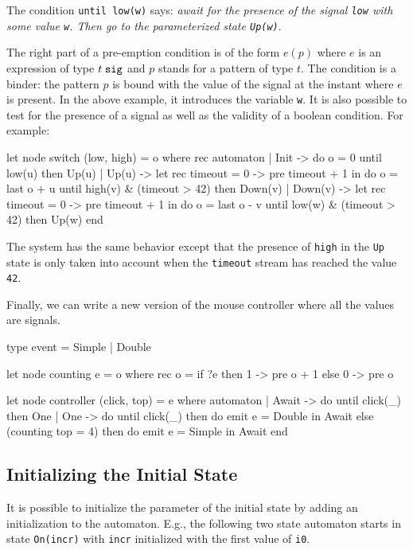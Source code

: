 \documentclass[11pt,titlepage,twoside]{report}
\begin{document}
The condition \verb-until low(w)- says: {\em await for the presence of
  the signal \verb-low- with some value \verb-w-. Then go to the
  parameterized state \verb-Up(w)-}.

\newcommand{\Signal}[1]{{#1}\;\mbox{\tt sig}}

The right part of a pre-emption condition is of the form $e(p)$ where
$e$ is an expression of type $\Signal{t}$ and $p$ stands for a pattern
of type $t$. The condition is a binder: the pattern $p$ is bound with
the value of the signal at the instant where $e$ is present.  In the
above example, it introduces the variable \verb-w-. It is also
possible to test for the presence of a signal as well as the validity
of a boolean condition. For example:

\begin{runverbatim}[withresult]
let node switch (low, high) = o where
  rec automaton
  | Init -> do o = 0 until low(u) then Up(u)
  | Up(u) ->
      let rec timeout = 0 -> pre timeout + 1 in
      do o = last o + u
      until high(v) & (timeout > 42) then Down(v)
  | Down(v) ->
      let rec timeout = 0 -> pre timeout + 1 in
      do o = last o - v
      until low(w) & (timeout > 42) then Up(w)
  end
\end{runverbatim}
The system has the same behavior except that the presence of
\verb-high- in the \verb-Up- state is only taken into account when the
\verb-timeout- stream has reached the value \verb-42-.

Finally, we can write a new version of the mouse controller where all
the values are signals.

\begin{runverbatim}[withresult]
type event = Simple | Double

let node counting e = o where
  rec o = if ?e then 1 -> pre o + 1 else 0 -> pre o

let node controller (click, top) = e where
  automaton
  | Await ->
     do until click(_) then One
  | One ->
     do until click(_) then do emit e = Double in Await
     else (counting top = 4) then do emit e = Simple in Await
  end
\end{runverbatim}

\subsection{Initializing the Initial State}
It is possible to initialize the parameter of the initial state by adding
an initialization to the automaton. E.g., the following two state automaton
starts in state \texttt{On(incr)} with \texttt{incr} initialized with the first
value of \texttt{i0}.
\end{document}
